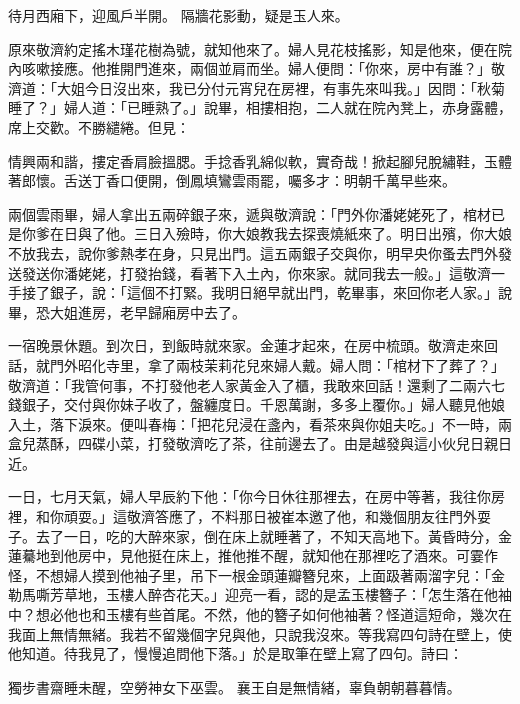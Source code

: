 \begin{showcontents}{}
待月西廂下，迎風戶半開。
隔牆花影動，疑是玉人來。

原來敬濟約定搖木瑾花樹為號，就知他來了。婦人見花枝搖影，知是他來，便在院內咳嗽接應。他推開門進來，兩個並肩而坐。婦人便問：「你來，房中有誰？」敬濟道：「大姐今日沒出來，我已分付元宵兒在房裡，有事先來叫我。」因問：「秋菊睡了？」婦人道：「已睡熟了。」說畢，相摟相抱，二人就在院內凳上，赤身露體，席上交歡。不勝繾綣。但見：

情興兩和諧，摟定香肩臉搵腮。手捻香乳綿似軟，實奇哉！掀起腳兒脫繡鞋，玉體著郎懷。舌送丁香口便開，倒鳳填鸞雲雨罷，囑多才：明朝千萬早些來。

兩個雲雨畢，婦人拿出五兩碎銀子來，遞與敬濟說：「門外你潘姥姥死了，棺材已是你爹在日與了他。三日入殮時，你大娘教我去探喪燒紙來了。明日出殯，你大娘不放我去，說你爹熱孝在身，只見出門。這五兩銀子交與你，明早央你蚤去門外發送發送你潘姥姥，打發抬錢，看著下入土內，你來家。就同我去一般。」這敬濟一手接了銀子，說：「這個不打緊。我明日絕早就出門，乾畢事，來回你老人家。」說畢，恐大姐進房，老早歸廂房中去了。

一宿晚景休題。到次日，到飯時就來家。金蓮才起來，在房中梳頭。敬濟走來回話，就門外昭化寺里，拿了兩枝茉莉花兒來婦人戴。婦人問：「棺材下了葬了？」敬濟道：「我管何事，不打發他老人家黃金入了櫃，我敢來回話！還剩了二兩六七錢銀子，交付與你妹子收了，盤纏度日。千恩萬謝，多多上覆你。」婦人聽見他娘入土，落下淚來。便叫春梅：「把花兒浸在盞內，看茶來與你姐夫吃。」不一時，兩盒兒蒸酥，四碟小菜，打發敬濟吃了茶，往前邊去了。由是越發與這小伙兒日親日近。

一日，七月天氣，婦人早辰約下他：「你今日休往那裡去，在房中等著，我往你房裡，和你頑耍。」這敬濟答應了，不料那日被崔本邀了他，和幾個朋友往門外耍子。去了一日，吃的大醉來家，倒在床上就睡著了，不知天高地下。黃昏時分，金蓮驀地到他房中，見他挺在床上，推他推不醒，就知他在那裡吃了酒來。可霎作怪，不想婦人摸到他袖子里，吊下一根金頭蓮瓣簪兒來，上面趿著兩溜字兒：「金勒馬嘶芳草地，玉樓人醉杏花天。」迎亮一看，認的是孟玉樓簪子：「怎生落在他袖中？想必他也和玉樓有些首尾。不然，他的簪子如何他袖著？怪道這短命，幾次在我面上無情無緒。我若不留幾個字兒與他，只說我沒來。等我寫四句詩在壁上，使他知道。待我見了，慢慢追問他下落。」於是取筆在壁上寫了四句。詩曰：

獨步書齋睡未醒，空勞神女下巫雲。
襄王自是無情緒，辜負朝朝暮暮情。


\end{showcontents}
